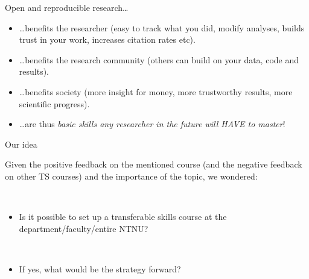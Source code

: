 \documentclass[
  10pt,
  ignorenonframetext,
]{beamer}
\providecommand{\tightlist}{%
  \setlength{\itemsep}{0pt}\setlength{\parskip}{0pt}}
\begin{document}
\begin{frame}{Open and reproducible research\ldots{}}
\protect\hypertarget{open-and-reproducible-research}{}
\(~\)

\begin{itemize}
\tightlist
\item
  \ldots benefits the researcher (easy to track what you did, modify
  analyses, builds trust in your work, increases citation rates etc).
\end{itemize}

\vspace{2mm}

\begin{itemize}
\tightlist
\item
  \ldots benefits the research community (others can build on your data,
  code and results).
\end{itemize}

\vspace{2mm}

\begin{itemize}
\tightlist
\item
  \ldots benefits society (more insight for money, more trustworthy
  results, more scientific progress).
\end{itemize}

\vspace{2mm}

\begin{itemize}
\tightlist
\item
  \ldots are thus \emph{basic skills any researcher in the future will
  HAVE to master}!
\end{itemize}
\end{frame}

\begin{frame}
\begin{block}{Our idea}
\protect\hypertarget{our-idea}{}
\(~\)

Given the positive feedback on the mentioned course (and the negative
feedback on other TS courses) and the importance of the topic, we
wondered:

\(~\)

\begin{itemize}
\tightlist
\item
  Is it possible to set up a transferable skills course at the
  department/faculty/entire NTNU?
\end{itemize}

\(~\)

\begin{itemize}
\tightlist
\item
  If yes, what would be the strategy forward?
\end{itemize}
\end{block}
\end{frame}
\end{document}
